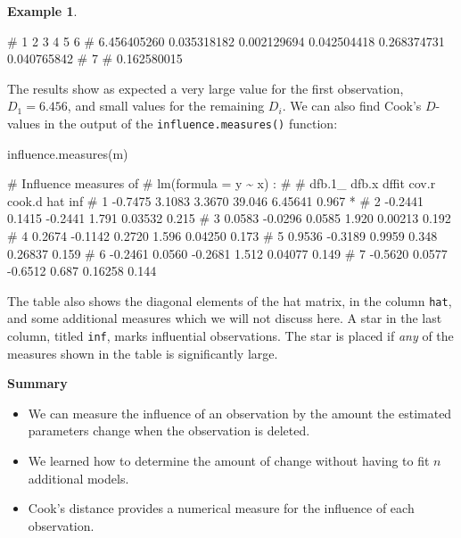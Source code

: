 \documentclass[
  a4paper,
]{article}
\newenvironment{Shaded}{\begin{snugshade}}{\end{snugshade}}
\newcommand{\FunctionTok}[1]{\textcolor[rgb]{0.00,0.00,0.00}{#1}}
\newcommand{\NormalTok}[1]{#1}
\providecommand{\tightlist}{%
  \setlength{\itemsep}{0pt}\setlength{\parskip}{0pt}}
\theoremstyle{definition}
\theoremstyle{definition}
\newtheorem{example}{Example}[section]
\theoremstyle{definition}
\theoremstyle{definition}
\theoremstyle{remark}
\begin{document}
\begin{example}
\begin{Shaded}
\begin{Highlighting}[]
\NormalTok{\#           1           2           3           4           5           6 }
\NormalTok{\# 6.456405260 0.035318182 0.002129694 0.042504418 0.268374731 0.040765842 }
\NormalTok{\#           7 }
\NormalTok{\# 0.162580015}
\end{Highlighting}
\end{Shaded}

The results show as expected a very large value for the first observation,
\(D_1 = 6.456\), and small values for the remaining \(D_i\).
We can also find Cook's \(D\)-values in the output of the
\texttt{influence.measures()} function:

\begin{Shaded}
\begin{Highlighting}[]
\FunctionTok{influence.measures}\NormalTok{(m)}
\end{Highlighting}
\end{Shaded}

\begin{Shaded}
\begin{Highlighting}[]
\NormalTok{\# Influence measures of}
\NormalTok{\#    lm(formula = y \textasciitilde{} x) :}
\NormalTok{\# }
\NormalTok{\#    dfb.1\_   dfb.x   dffit  cov.r  cook.d   hat inf}
\NormalTok{\# 1 {-}0.7475  3.1083  3.3670 39.046 6.45641 0.967   *}
\NormalTok{\# 2 {-}0.2441  0.1415 {-}0.2441  1.791 0.03532 0.215    }
\NormalTok{\# 3  0.0583 {-}0.0296  0.0585  1.920 0.00213 0.192    }
\NormalTok{\# 4  0.2674 {-}0.1142  0.2720  1.596 0.04250 0.173    }
\NormalTok{\# 5  0.9536 {-}0.3189  0.9959  0.348 0.26837 0.159    }
\NormalTok{\# 6 {-}0.2461  0.0560 {-}0.2681  1.512 0.04077 0.149    }
\NormalTok{\# 7 {-}0.5620  0.0577 {-}0.6512  0.687 0.16258 0.144}
\end{Highlighting}
\end{Shaded}

The table also shows the diagonal elements of the hat matrix, in the
column \texttt{hat}, and some additional measures which we will not discuss here.
A star in the last column, titled \texttt{inf}, marks influential observations.
The star is placed if \emph{any} of the measures shown in the table is significantly
large.
\end{example}

\textbf{Summary}

\begin{itemize}
\tightlist
\item
  We can measure the influence of an observation by the amount
  the estimated parameters change when the observation is deleted.
\item
  We learned how to determine the amount of change without
  having to fit \(n\) additional models.
\item
  Cook's distance provides a numerical measure for the influence of each
  observation.
\end{itemize}
\end{document}
